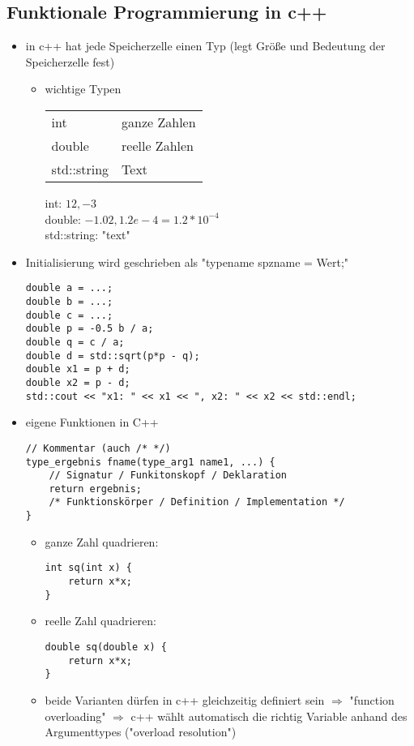 \documentclass[a4paper]{scrartcl}
\begin{document}
\subsection{Funktionale Programmierung in c++}
\label{sec-7-3}
\begin{itemize}
\item in c++ hat jede Speicherzelle einen Typ (legt Größe und Bedeutung der Speicherzelle fest)
\begin{itemize}
\item wichtige Typen
\begin{center}
\begin{tabular}{ll}
int & ganze Zahlen\\
double & reelle Zahlen\\
std::string & Text\\
\end{tabular}
\end{center}
int: $12,-3$ \\
       double: $-1.02,1.2e-4 = 1.2*10^{-4}$ \\
       std::string: "text"
\end{itemize}
\item Initialisierung wird geschrieben als "typename spzname = Wert;"
\begin{verbatim}
double a = ...;
double b = ...;
double c = ...;
double p = -0.5 b / a;
double q = c / a;
double d = std::sqrt(p*p - q);
double x1 = p + d;
double x2 = p - d;
std::cout << "x1: " << x1 << ", x2: " << x2 << std::endl;
\end{verbatim}
\item eigene Funktionen in C++
\begin{verbatim}
// Kommentar (auch /* */)
type_ergebnis fname(type_arg1 name1, ...) {
	// Signatur / Funkitonskopf / Deklaration
	return ergebnis;                      
	/* Funktionskörper / Definition / Implementation */
}
\end{verbatim}
\begin{itemize}
\item ganze Zahl quadrieren:
\begin{verbatim}
int sq(int x) {
	return x*x;
}
\end{verbatim}
\item reelle Zahl quadrieren:
\begin{verbatim}
double sq(double x) {
	return x*x;
}
\end{verbatim}
\item beide Varianten dürfen in c++ gleichzeitig definiert sein $\Rightarrow$ "function overloading" $\Rightarrow$ c++ wählt automatisch die richtig Variable anhand des Argumenttypes ("overload resolution")

\end{itemize}
\end{itemize}
\end{document}
